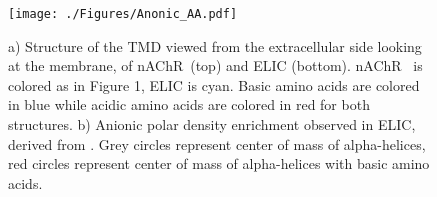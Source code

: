 \documentclass[12pt]{ruthesis_nofloat}
\newcommand{\nachr}{nAChR}
\newcommand{\plgic}{pLGIC}
\begin{document}
\renewcommand{\thefigure}{D2}
\begin{figure}
	\center
	\texttt{[image: ./Figures/Anonic\_AA.pdf]}
	\caption[Charged amino acids in or near the TMD of two \plgic s and corresponding anionic enrichment.] {a) Structure of the TMD viewed from the extracellular side looking at the membrane, of \nachr~(top)\cite{Unwin2005} and ELIC\cite{Pan2012} (bottom). \nachr~ is colored as in Figure 1, ELIC is cyan. Basic amino acids are colored in blue while acidic amino acids are colored in red for both structures. b) Anionic polar density enrichment observed in ELIC, derived from \cite{Tong2019}. Grey circles represent center of mass of alpha-helices, red circles represent center of mass of alpha-helices with basic amino acids. }
	\label{fig:aaa}
\end{figure}
\renewcommand{\thetable}{D2}
\end{document}

